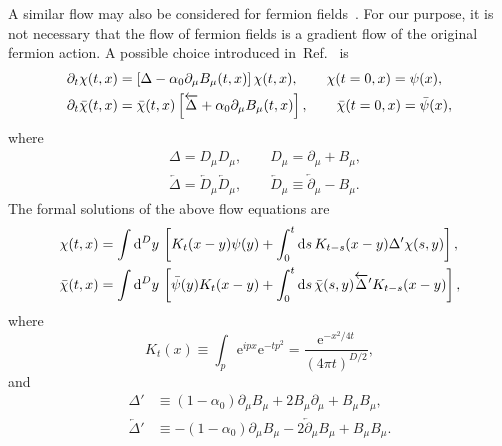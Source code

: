A similar flow may also be considered for fermion
fields~\cite{Luscher:2013cpa}. For our purpose, it is not necessary that the
flow of fermion fields is a gradient flow of the original fermion action. A
possible choice introduced in~Ref.~\cite{Luscher:2013cpa} is
\begin{align}
   &\partial_t\chi(t,x)=\left[\Delta-\alpha_0\partial_\mu B_\mu(t,x)\right]
   \chi(t,x),\qquad
   \chi(t=0,x)=\psi(x),
\label{eq:(3.8)}\\
   &\partial_t\Bar{\chi}(t,x)
   =\Bar{\chi}(t,x)
   \left[\overleftarrow{\Delta}
   +\alpha_0\partial_\mu B_\mu(t,x)\right],
   \qquad\Bar{\chi}(t=0,x)=\Bar{\psi}(x),
\label{eq:(3.9)}
\end{align}
where
\begin{align}
   &\Delta=D_\mu D_\mu,\qquad D_\mu=\partial_\mu+B_\mu,
\label{eq:(3.10)}\\
   &\overleftarrow{\Delta}=\overleftarrow{D}_\mu\overleftarrow{D}_\mu,
   \qquad\overleftarrow{D}_\mu\equiv\overleftarrow{\partial}_\mu-B_\mu.
\label{eq:(3.11)}
\end{align}
The formal solutions of the above flow equations are
\begin{align}
   \chi(t,x)&=\int\mathrm{d}^Dy\,
   \left[
   K_t(x-y)\psi(y)
   +\int_0^t\mathrm{d}s\,K_{t-s}(x-y)\Delta'\chi(s,y)
   \right],
\label{eq:(3.12)}\\
   \Bar{\chi}(t,x)&=\int\mathrm{d}^Dy\,
   \left[
   \Bar{\psi}(y)K_t(x-y)
   +\int_0^t\mathrm{d}s\,\Bar{\chi}(s,y)\overleftarrow{\Delta}'K_{t-s}(x-y)
   \right],
\label{eq:(3.13)}
\end{align}
where
\begin{equation}
   K_t(x)\equiv\int_p \mathrm{e}^{ipx}\mathrm{e}^{-tp^2}=\frac{\mathrm{e}^{-x^2/4t}}{(4\pi t)^{D/2}},
\label{eq:(3.14)}
\end{equation}
and
\begin{align}
   \Delta'&\equiv(1-\alpha_0)\partial_\mu B_\mu
   +2B_\mu\partial_\mu+B_\mu B_\mu,
\label{eq:(3.15)}\\
   \overleftarrow{\Delta}'&
   \equiv-(1-\alpha_0)\partial_\mu B_\mu
   -2\overleftarrow{\partial}_\mu B_\mu+B_\mu B_\mu.
\label{eq:(3.16)}
\end{align}

